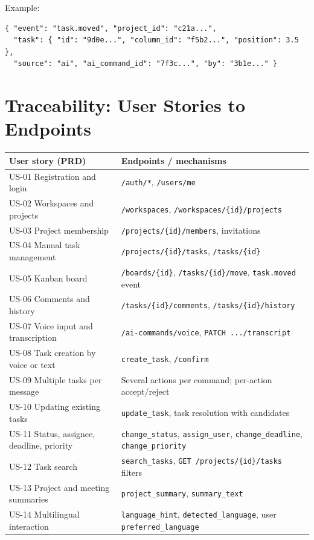 \documentclass[11pt,a4paper]{article}
\newcommand{\tblstart}{\small\rowcolors{2}{gray!7}{white}}
\newcommand{\code}[1]{\texttt{#1}}
\begin{document}
Example:
\begin{Verbatim}
{ "event": "task.moved", "project_id": "c21a...",
  "task": { "id": "9d0e...", "column_id": "f5b2...", "position": 3.5 },
  "source": "ai", "ai_command_id": "7f3c...", "by": "3b1e..." }
\end{Verbatim}

\section{Traceability: User Stories to Endpoints}

{\tblstart
\begin{xltabular}{\textwidth}{P{4.4cm} L}
\toprule
\textbf{User story (PRD)} & \textbf{Endpoints / mechanisms} \\
\midrule
\endhead
US-01 Registration and login & \code{/auth/*}, \code{/users/me} \\
US-02 Workspaces and projects & \code{/workspaces}, \code{/workspaces/\{id\}/projects} \\
US-03 Project membership & \code{/projects/\{id\}/members}, invitations \\
US-04 Manual task management & \code{/projects/\{id\}/tasks}, \code{/tasks/\{id\}} \\
US-05 Kanban board & \code{/boards/\{id\}}, \code{/tasks/\{id\}/move}, \code{task.moved} event \\
US-06 Comments and history & \code{/tasks/\{id\}/comments}, \code{/tasks/\{id\}/history} \\
US-07 Voice input and transcription & \code{/ai-commands/voice}, \code{PATCH .../transcript} \\
US-08 Task creation by voice or text & \code{create\_task}, \code{/confirm} \\
US-09 Multiple tasks per message & Several actions per command; per-action accept/reject \\
US-10 Updating existing tasks & \code{update\_task}, task resolution with candidates \\
US-11 Status, assignee, deadline, priority & \code{change\_status}, \code{assign\_user}, \code{change\_deadline}, \code{change\_priority} \\
US-12 Task search & \code{search\_tasks}, \code{GET /projects/\{id\}/tasks} filters \\
US-13 Project and meeting summaries & \code{project\_summary}, \code{summary\_text} \\
US-14 Multilingual interaction & \code{language\_hint}, \code{detected\_language}, user \code{preferred\_language} \\

\end{xltabular}}
\end{document}
